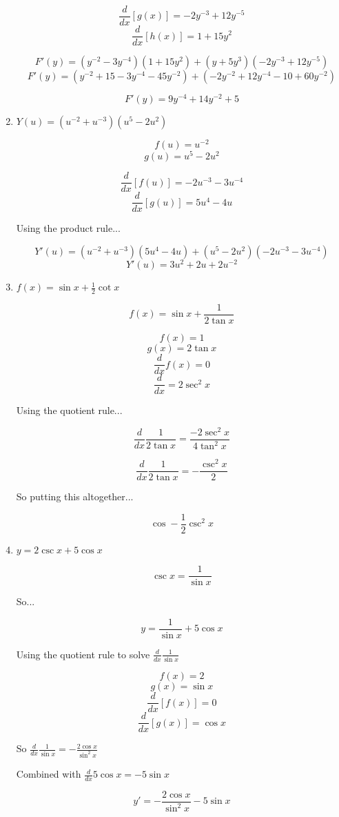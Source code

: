 \documentclass{article}
\begin{document}
\begin{enumerate}
			$$\frac{d}{dx} [g(x)] = -2y^{-3} + 12y^{-5}$$
			$$\frac{d}{dx} [h(x)] = 1 + 15y^2$$

			$$F'(y) = (y^{-2} - 3y^{-4})(1 + 15y^2) + (y + 5y^{3})(-2y^{-3} + 12y^{-5})$$
			$$F'(y) = (y^{-2} + 15 - 3y^{-4} - 45y^{-2}) + (-2y^{-2} + 12y^{-4} - 10 + 60y^{-2})$$

			$$F'(y) = 9y^{-4} + 14y^{-2} + 5$$

		\item $Y(u) = (u^{-2} + u^{-3})(u^{5}-2u^{2})$

			$$f(u) = u^{-2}$$
			$$g(u) = u^{5} - 2u^{2}$$

			$$\frac{d}{dx} [f(u)] = -2u^{-3} - 3u^{-4}$$
			$$\frac{d}{dx} [g(u)] = 5u^4 - 4u$$

			Using the product rule...

			$$Y'(u) = (u^{-2} + u^{-3})(5u^{4} - 4u) + (u^5 - 2u^2)(-2u^{-3} - 3u^{-4})$$
			$$Y'(u) = 3u^2 + 2u + 2u^{-2}$$

		\item $f(x) = \sin x + \frac{1}{2} \cot x$

			$$f(x) = \sin x + \frac{1}{2\tan x}$$
			
			$$f(x) = 1$$
			$$g(x) = 2\tan x$$
			$$\frac{d}{dx} f(x) = 0$$
			$$\frac{d}{dx} = 2\sec ^{2} x$$

			Using the quotient rule...

			$$\frac{d}{dx} \frac{1}{2\tan x} = \frac{- 2\sec ^{2} x}{4 \tan ^{2} x}$$

			$$\frac{d}{dx} \frac{1}{2\tan x} = - \frac{\csc ^{2} x}{2}$$

			So putting this altogether...

			$$\cos - \frac{1}{2} \csc ^{2} x$$

		\item $y = 2\csc x + 5 \cos x$

			$$\csc x = \frac{1}{\sin x}$$

			So...

			$$y = \frac{1}{\sin x} + 5\cos x$$

			Using the quotient rule to solve $\frac{d}{dx} \frac{1}{\sin x}$

			$$f(x) = 2$$
			$$g(x) = \sin x$$
			$$\frac{d}{dx} [f(x)] = 0$$
			$$\frac{d}{dx} [g(x)] = \cos x$$

			So $\frac{d}{dx} \frac{1}{\sin x} = - \frac{2\cos x}{\sin^{2} x}$

			Combined with $\frac{d}{dx} 5\cos x = - 5\sin x$

			$$y' = - \frac{2\cos x}{\sin^{2} x} - 5 \sin x$$
			
	\end{enumerate}
\end{document}

